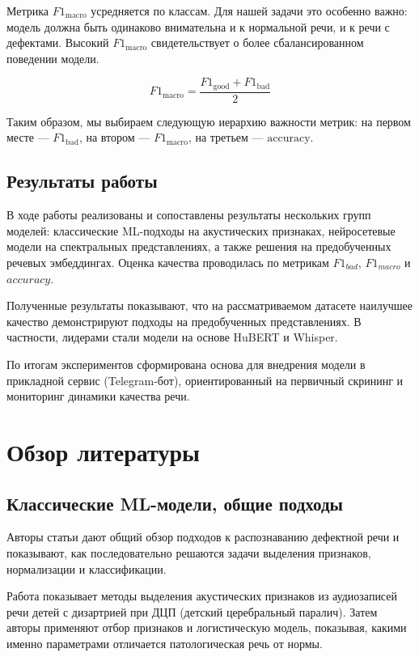 \documentclass[a4paper,14pt]{extarticle}
\begin{document}
Метрика $F1_{\text{macro}}$ усредняется по классам. Для нашей задачи
это особенно важно: модель должна быть одинаково внимательна и к
нормальной речи, и к речи с дефектами. Высокий $F1_{\text{macro}}$
свидетельствует о более сбалансированном поведении модели.

\[
  F1_{\text{macro}} =
  \frac{F1_{\text{good}} + F1_{\text{bad}}}{2}
\]

Таким образом, мы выбираем следующую иерархию важности метрик:
на первом месте — $F1_{\text{bad}}$, на втором — $F1_{\text{macro}}$,
на третьем — $\text{accuracy}$.

\subsection{Результаты работы}

В ходе работы реализованы и сопоставлены результаты нескольких групп моделей: классические ML-подходы на акустических признаках, нейросетевые модели на спектральных представлениях, а также решения на предобученных речевых эмбеддингах. Оценка качества проводилась по метрикам $F1_{bad}$, $F1_{macro}$ и $accuracy$.

Полученные результаты показывают, что на рассматриваемом датасете наилучшее качество демонстрируют подходы на предобученных представлениях. В частности, лидерами стали модели на основе HuBERT и Whisper. 

По итогам экспериментов сформирована основа для внедрения модели в прикладной сервис (Telegram-бот), ориентированный на первичный скрининг и мониторинг динамики качества речи.


\section{Обзор литературы}

\subsection{Классические ML-модели, общие подходы}

Авторы статьи \textbf{\cite{methods_defective_speech_rus}} дают общий обзор подходов к распознаванию дефектной речи и показывают, как  последовательно решаются задачи выделения признаков, нормализации и классификации.

Работа \textbf{\cite{su2018_acoustic_predictors_pediatric_dysarthria}} показывает методы выделения акустических признаков из аудиозаписей речи детей с дизартрией при ДЦП (детский церебральный паралич). Затем авторы применяют отбор признаков и логистическую модель, показывая, какими именно параметрами отличается патологическая речь от нормы.
\end{document}
